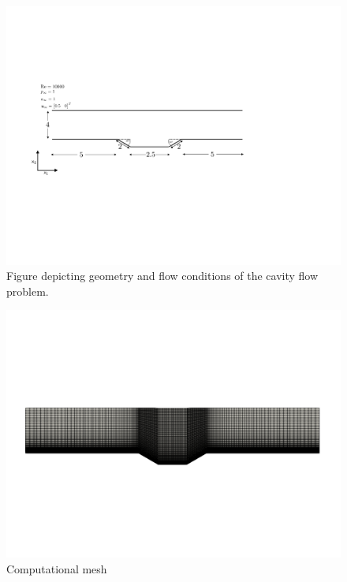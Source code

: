 \begin{figure}
\begin{center}
\includegraphics[trim={2cm 7cm 4cm 6cm},clip,width=0.95\linewidth]{cav_fig.pdf}
\caption{Figure depicting geometry and flow conditions of the cavity flow problem.} 
\label{fig:cav_fig}
\end{center}
\end{figure}

\begin{figure}
\begin{center}
\includegraphics[trim={0cm 14cm 0cm 14cm},clip,width=1.\linewidth]{figs/cavity/grid.png}
\caption{Computational mesh}
\label{fig:cav_mesh}
\end{center}
\end{figure}

